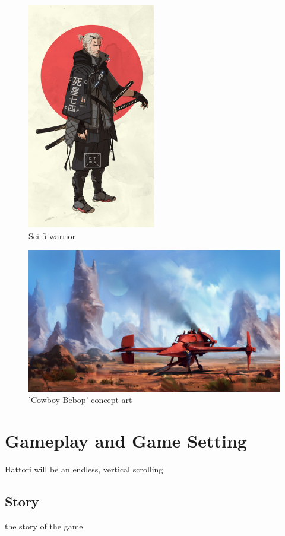 \documentclass[a4paper]{scrreprt}
\begin{document}
\begin{figure}[h!]
\centering
\includegraphics[width=0.5\textwidth]{Warrior}
\caption{Sci-fi warrior}
\end{figure}

\begin{figure}[h!]
\centering
\includegraphics[width=1\textwidth]{Spaceship}
\caption{'Cowboy Bebop' concept art}
\end{figure}

\chapter{Gameplay and Game Setting}
Hattori will be an endless, vertical scrolling
\section{Story}
the story of the game
\end{document}

